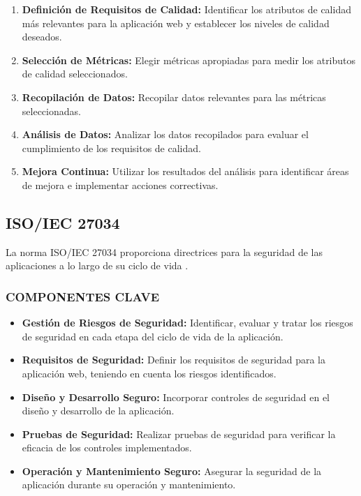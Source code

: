\begin{enumerate}
    \item \textbf{Definición de Requisitos de Calidad:} Identificar los atributos de calidad más relevantes para la aplicación web y establecer los niveles de calidad deseados.
    \item \textbf{Selección de Métricas:} Elegir métricas apropiadas para medir los atributos de calidad seleccionados.
    \item \textbf{Recopilación de Datos:} Recopilar datos relevantes para las métricas seleccionadas.
    \item \textbf{Análisis de Datos:} Analizar los datos recopilados para evaluar el cumplimiento de los requisitos de calidad.
    \item \textbf{Mejora Continua:} Utilizar los resultados del análisis para identificar áreas de mejora e implementar acciones correctivas.
\end{enumerate}

\subsection{ISO/IEC 27034}

La norma ISO/IEC 27034 proporciona directrices para la seguridad de las aplicaciones a lo largo de su ciclo de vida \citep{iso27034}.

\subsubsection{COMPONENTES CLAVE}

\begin{itemize}
    \item \textbf{Gestión de Riesgos de Seguridad:} Identificar, evaluar y tratar los riesgos de seguridad en cada etapa del ciclo de vida de la aplicación.
    \item \textbf{Requisitos de Seguridad:} Definir los requisitos de seguridad para la aplicación web, teniendo en cuenta los riesgos identificados.
    \item \textbf{Diseño y Desarrollo Seguro:} Incorporar controles de seguridad en el diseño y desarrollo de la aplicación.
    \item \textbf{Pruebas de Seguridad:} Realizar pruebas de seguridad para verificar la eficacia de los controles implementados.
    \item \textbf{Operación y Mantenimiento Seguro:} Asegurar la seguridad de la aplicación durante su operación y mantenimiento.
\end{itemize}

